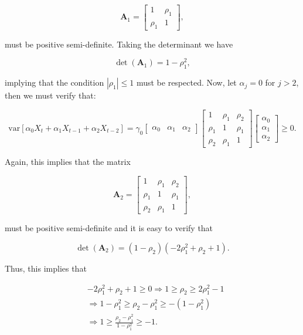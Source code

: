 \documentclass[]{book}
\theoremstyle{definition}
\theoremstyle{definition}
\theoremstyle{definition}
\theoremstyle{remark}
\begin{document}
\[ \boldsymbol{A}_1 = \begin{bmatrix}
  1 & \rho_1\\
  \rho_1 & 1
  \end{bmatrix}, \]

must be positive semi-definite. Taking the determinant we have

\[\operatorname{det} \left(\boldsymbol{A}_1\right) = 1 - \rho_1^2, \]

implying that the condition \(|\rho_1| \leq 1\) must be respected. Now,
let \(\alpha_j = 0\) for \(j > 2\), then we must verify that:

\[\text{var} \left[ \alpha_0 X_{t} + \alpha_1 X_{t-1}  + \alpha_2 X_{t-2} \right] = \gamma_0 \begin{bmatrix}
     \alpha_0 & \alpha_1 &\alpha_2
     \end{bmatrix}   \begin{bmatrix}
     1 & \rho_1 & \rho_2\\
     \rho_1 & 1 & \rho_1 \\
     \rho_2 & \rho_1 & 1
     \end{bmatrix} \begin{bmatrix}
     \alpha_0 \\
     \alpha_1 \\
     \alpha_2
     \end{bmatrix} \geq 0. \]

Again, this implies that the matrix

\[ \boldsymbol{A}_2 = \begin{bmatrix}
  1 & \rho_1 & \rho_2\\
  \rho_1 & 1 & \rho_1 \\
  \rho_2 & \rho_1 & 1
  \end{bmatrix}, \]

must be positive semi-definite and it is easy to verify that

\[\operatorname{det} \left(\boldsymbol{A}_2\right) = \left(1 - \rho_2 \right)\left(- 2 \rho_1^2 + \rho_2 + 1\right). \]

Thus, this implies that

\[\begin{aligned} &- 2 \rho_1^2 + \rho_2 + 1 \geq 0 \Rightarrow 1 \geq \rho_2 \geq 2 \rho_1^2 - 1 \\
   &\Rightarrow 1 - \rho_1^2 \geq \rho_2 - \rho_1^2 \geq -(1 - \rho_1^2)\\
   &\Rightarrow 1 \geq \frac{\rho_2 - \rho_1^2 }{1 - \rho_1^2} \geq -1.
   \end{aligned}\]
\end{document}
